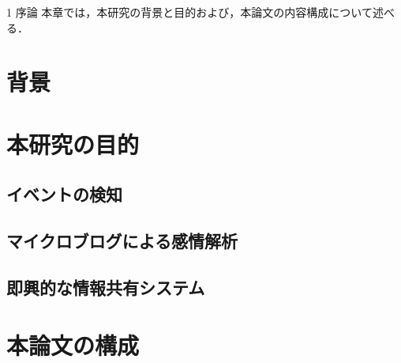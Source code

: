 \chapterhead
{1}
{序論}
{本章では，本研究の背景と目的および，本論文の内容構成について述べる．}

\section{背景}

\newpage

\section{本研究の目的}
\subsection{イベントの検知}

\newpage

\subsection{マイクロブログによる感情解析}

\newpage

\subsection{即興的な情報共有システム}

\section{本論文の構成}
